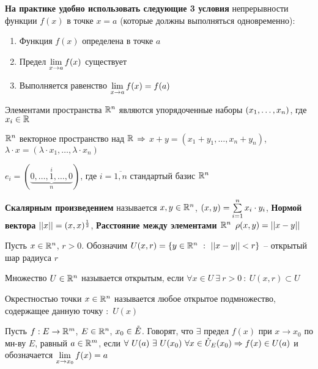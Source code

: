 \textbf{На практике удобно использовать следующие 3 условия} непрерывности функции $f(x)$ в точке $x = a$ (которые должны выполняться одновременно):
\begin{enumerate}
	\item Функция $f(x)$ определена в точке $a$
	\item Предел $\lim\limits_{x \to a}f(x)$ существует
	\item Выполняется равенство $\lim\limits_{x \to a}f(x)= f(a)$
\end{enumerate}

\begin{DEF}
	Элементами пространства $\mathbb{R}^n$ являются упорядоченные наборы $\left(x_1,\ldots,x_n\right)$, где $x_i \in \mathbb{R}$
\end{DEF}

\begin{DEF}
	$\mathbb{R}^n$ векторное пространство над $\mathbb{R}$ $\Rightarrow$ $x + y = (x_1+y_1, \ldots, x_{n}+y_{n})$, $\lambda \cdot x = (\lambda \cdot x_1, \ldots, \lambda \cdot x_n)$
\end{DEF}

\begin{DEF}
	$e_i = (\underbrace{0, \ldots, 1,\ldots,0}_n^i)$, где $i = \overline{1,n}$ стандартый базис $\mathbb{R}^n$
\end{DEF}

\begin{DEF}
	\textbf{Скалярным произведением} называется $x,y \in \mathbb{R}^n$, $\left( x,y\right) = \sum\limits_{i=1}^{n}x_i \cdot y_i$, \textbf{Нормой вектора} $\left|\left| x\right|\right| = (x,x)^{\frac{1}{2}}$, \textbf{Расстояние между элементами $\mathbb{R}^n$} $\rho(x,y)= \left|\left| x-y\right|\right|$
\end{DEF}

\begin{DEF}
	Пусть $x \in \mathbb{R}^n$, $r > 0$. Обозначим $U(x,r) = \fskobk{y \in \Rmern{n} \ : \ \DModul{x-y} < r}$ -- открытый шар радиуса $r$
\end{DEF}

\begin{DEF}
	Множество $U \in \mathbb{R}^n$ называется открытым, если $\forall x \in U \ \exists \ r > 0 \ : \  U(x,r) \subset U$
\end{DEF}

\begin{DEF}
	Окрестностью точки $x \in \mathbb{R}^n$ называется любое открытое подмножество, содержащее данную точку $:$ $U(x)$
\end{DEF}

\begin{DEF}
	Пусть $f: E \to \mathbb{R}^m$, $E \in \mathbb{R}^n$, $x_0 \in \mathring{E}$. Говорят, что $\exists$ предел $f(x)$ при $x\to x_0$ по мн-ву $E$, равный $a \in \mathbb{R}^m$, если $\forall \ U(a) \ \exists \ U(x_0) \ \forall x \in \mathring{U}_{E}(x_0) \Rightarrow f(x) \in U(a)$
	и обозначается $\lim\limits_{x \to x_0}f(x)= a$
\end{DEF}

